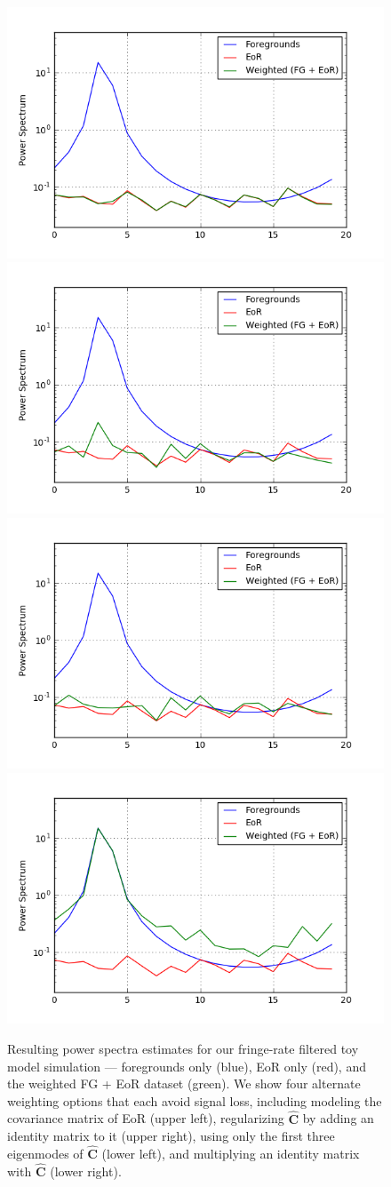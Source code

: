 \documentclass[preprint2,numberedappendix,tighten]{aastex6}  %
\begin{document}
\begin{figure}
	\centering
	\includegraphics[trim={0.4cm 0.8cm 1.3cm 1cm},clip,height=0.25\textwidth]{plots/toy_sigloss10.png}
	\includegraphics[trim={1cm 0.8cm 1.3cm 1cm},clip,height=0.25\textwidth]{plots/toy_sigloss8.png}
	\includegraphics[trim={0.4cm 0.8cm 1.3cm 1cm},clip,height=0.25\textwidth]{plots/toy_sigloss9.png}
	\includegraphics[trim={1cm 0.8cm 1.3cm 1cm},clip,height=0.25\textwidth]{plots/toy_sigloss11.png}
	\caption{Resulting power spectra estimates for our fringe-rate filtered toy model simulation --- foregrounds only (blue), EoR only (red), and the weighted FG + EoR dataset (green). We show four alternate weighting options that each avoid signal loss, including modeling the covariance matrix of EoR (upper left), regularizing $\hat{\textbf{C}}$ by adding an identity matrix to it (upper right), using only the first three eigenmodes of $\hat{\textbf{C}}$ (lower left), and multiplying an identity matrix with $\hat{\textbf{C}}$ (lower right).}
	\label{fig:toy_sigloss8}
\end{figure}
\end{document}
